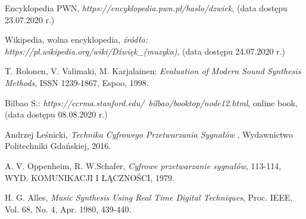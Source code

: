 \documentclass[nostrict]{szablonPG}
\begin{document}



	\setcounter{page}{3}
	\let\cleardoublepage\clearpage
	
	
	\tableofcontents    %
	
%	
	
	
	
	
	
	
	
%	
	
	

	\listoffigures      %
	\listoftables

	\begin{thebibliography}{20}                      %
		\small              %
		Encyklopedia PWN, \emph{https://encyklopedia.pwn.pl/haslo/dzwiek}, (data dostępu 23.07.2020 r.)
		
		Wikipedia, wolna encyklopedia, \emph{źródło: https://pl.wikipedia.org/wiki/Dźwięk\_(muzyka)}, (data dostępu 24.07.2020 r.)

		T. Rolonen, V. Valimaki, M. Karjalainen: \emph{Evaluation of Modern Sound Synthesis Methods}, ISSN 1239-1867, Espoo, 1998.

		Bilbao S.: \emph{https://ccrma.stanford.edu/~bilbao/booktop/node12.html}, online book, (data dostępu 08.08.2020 r.)
		
		Andrzej Le\'snicki, \emph{Technika Cyfrowego Przetwarzania Sygna\l{}\'ow }, Wydawnictwo Politechniki Gda\'nskiej, 2016.
		
		A. V. Oppenheim, R. W.Schafer, \emph{Cyfrowe przetwarzanie sygnałów}, 113-114, WYD. KOMUNIKACJI I ŁĄCZNOŚCI, 1979.
		
		 H. G. Alles, \emph{Music Synthesis Using Real Time Digital Techniques}, Proc. IEEE, Vol. 68, No. 4, Apr. 1980, 439-440.

			
	\end{thebibliography}
	
\end{document}
